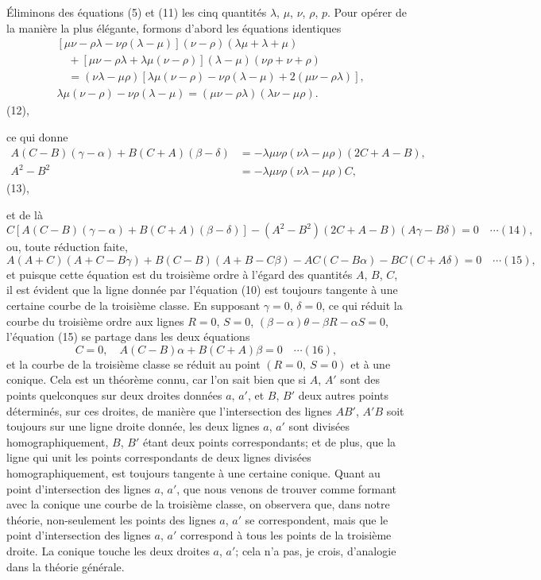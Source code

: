 \documentclass[12pt,a4paper]{article}
\begin{document}
\'Eliminons des \'equations (5) et (11) les cinq quantit\'es $\lambda$, $\mu$, $\nu$, $\rho$, $p$. Pour op\'erer de la mani\`ere la plus \'el\'egante, formons d'abord les \'equations identiques
\begin{align*}
&[\mu\nu - \rho\lambda - \nu\rho(\lambda - \mu)](\nu - \rho)(\lambda\mu + \lambda + \mu)\\
&\quad + [\mu\nu - \rho\lambda + \lambda\mu(\nu - \rho)](\lambda - \mu)(\nu\rho + \nu + \rho)\\
&\quad = (\nu\lambda - \mu\rho)[\lambda\mu(\nu - \rho) - \nu\rho(\lambda - \mu) + 2(\mu\nu - \rho\lambda)],\\
&\lambda\mu(\nu - \rho) - \nu\rho(\lambda - \mu) = (\mu\nu - \rho\lambda)(\lambda\nu - \mu\rho).
\end{align*}
\hfill (12),

\noindent ce qui donne
\begin{align*}
A(C - B)(\gamma - \alpha) + B(C + A)(\beta - \delta) &= -\lambda\mu\nu\rho(\nu\lambda - \mu\rho)(2C + A - B),\\
A^2 - B^2 &= -\lambda\mu\nu\rho(\nu\lambda - \mu\rho)C,
\end{align*}
\hfill (13),

\noindent et de l\`a
\[
C[A(C - B)(\gamma - \alpha) + B(C + A)(\beta - \delta)] - (A^2 - B^2)(2C + A - B)(A\gamma - B\delta) = 0 \quad\cdots(14),
\]
ou, toute r\'eduction faite,
\[
A(A + C)(A + C - B\gamma) + B(C - B)(A + B - C\beta) - AC(C - B\alpha) - BC(C + A\delta) = 0 \quad\cdots(15),
\]
et puisque cette \'equation est du troisi\`eme ordre \`a l'\'egard des quantit\'es $A$, $B$, $C$, il est \'evident que la ligne donn\'ee par l'\'equation (10) est toujours tangente \`a une certaine courbe de la troisi\`eme classe. En supposant $\gamma = 0$, $\delta = 0$, ce qui r\'eduit la courbe du troisi\`eme ordre aux lignes $R = 0$, $S = 0$, $(\beta - \alpha)\theta - \beta R - \alpha S = 0$, l'\'equation (15) se partage dans les deux \'equations
\[
C = 0,\quad A(C - B)\alpha + B(C + A)\beta = 0 \quad\cdots(16),
\]
et la courbe de la troisi\`eme classe se r\'eduit au point $(R = 0,\ S = 0)$ et \`a une conique. Cela est un th\'eor\`eme connu, car l'on sait bien que si $A$, $A'$ sont des points quelconques sur deux droites donn\'ees $a$, $a'$, et $B$, $B'$ deux autres points d\'etermin\'es, sur ces droites, de mani\`ere que l'intersection des lignes $AB'$, $A'B$ soit toujours sur une ligne droite donn\'ee, les deux lignes $a$, $a'$ sont divis\'ees homographiquement, $B$, $B'$ \'etant deux points correspondants; et de plus, que la ligne qui unit les points correspondants de deux lignes divis\'ees homographiquement, est toujours tangente \`a une certaine conique. Quant au point d'intersection des lignes $a$, $a'$, que nous venons de trouver comme formant avec la conique une courbe de la troisi\`eme classe, on observera que, dans notre th\'eorie, non-seulement les points des lignes $a$, $a'$ se correspondent, mais que le point d'intersection des lignes $a$, $a'$ correspond \`a tous les points de la troisi\`eme droite. La conique touche les deux droites $a$, $a'$; cela n'a pas, je crois, d'analogie dans la th\'eorie g\'en\'erale.
\end{document}
